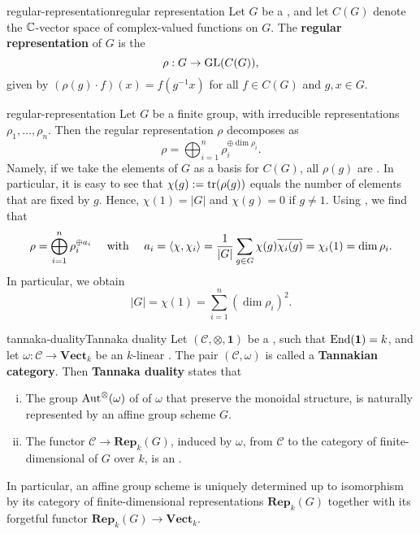 \begin{topic}{regular-representation}{regular representation}
    Let $G$ be a , and let $C(G)$ denote the $\mathbb{C}$-vector space of complex-valued functions on $G$. The \textbf{regular representation} of $G$ is the 
    \[ \rho : G \to \textup{GL}(C(G)) , \]
    given by $(\rho(g) \cdot f)(x) = f(g^{-1} x)$ for all $f \in C(G)$ and $g, x \in G$.
\end{topic}

\begin{example}{regular-representation}
    Let $G$ be a finite group, with irreducible representations $\rho_1, \ldots, \rho_n$. Then the regular representation $\rho$ decomposes as
    \[ \rho = \bigoplus_{i = 1}^{n} \rho_i^{\oplus \dim \rho_i} . \]
    Namely, if we take the elements of $G$ as a basis for $C(G)$, all $\rho(g)$ are . In particular, it is easy to see that $\chi(g) := \operatorname{tr}(\rho(g))$ equals the number of elements that are fixed by $g$. Hence, $\chi(1) = |G|$ and $\chi(g) = 0$ if $g \ne 1$. Using , we find that
    \[ \rho = \bigoplus_{i = 1}^{n} \rho_i^{\oplus a_i} \quad \textup{ with } \quad a_i = \langle \chi, \chi_i \rangle = \frac{1}{|G|} \sum_{g \in G} \chi(g) \overline{\chi_i(g)} = \chi_i(1) = \dim \rho_i . \]
    In particular, we obtain
    \[ |G| = \chi(1) = \sum_{i = 1}^{n} (\dim \rho_i)^2 . \]
\end{example}

\begin{topic}{tannaka-duality}{Tannaka duality}
    Let $(\mathcal{C}, \otimes, \textbf{1})$ be a   , such that $\textup{End}(\textbf{1}) = k$, and let $\omega : \mathcal{C} \to \textbf{Vect}_k$ be an   $k$-linear  . The pair $(\mathcal{C}, \omega)$ is called a \textbf{Tannakian category}. Then \textbf{Tannaka duality} states that
    \begin{enumerate}[(i)]
        \item The group $\textup{Aut}^\otimes(\omega)$ of  of $\omega$ that preserve the monoidal structure, is naturally represented by an affine group scheme $G$.
        \item The functor $\mathcal{C} \to \textbf{Rep}_k(G)$, induced by $\omega$, from $\mathcal{C}$ to the category of finite-dimensional  of $G$ over $k$, is an .
    \end{enumerate}
    In particular, an affine group scheme is uniquely determined up to isomorphism by its category of finite-dimensional representations $\textbf{Rep}_k(G)$ together with its forgetful functor $\textbf{Rep}_k(G) \to \textbf{Vect}_k$.
\end{topic}

